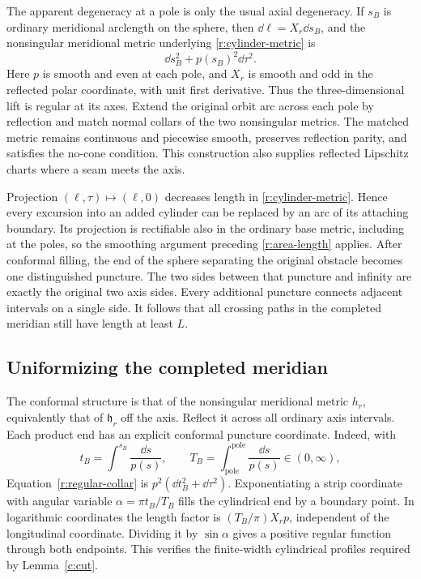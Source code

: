 The apparent degeneracy at a pole is only the usual axial degeneracy.
If $s_B$ is ordinary meridional arclength on the sphere, then
$\dd\ell=X_r\dd s_B$, and the nonsingular meridional metric underlying
\eqref{r:cylinder-metric} is
\begin{equation}\label{r:regular-collar}
 \dd s_B^2+p(s_B)^2\dd\tau^2.
\end{equation}
Here $p$ is smooth and even at each pole, and $X_r$ is smooth and odd in
the reflected polar coordinate, with unit first derivative.  Thus the
three-dimensional lift is regular at its axes.  Extend the original
orbit arc across each pole by reflection and match normal collars of the
two nonsingular metrics.  The matched metric remains continuous and
piecewise smooth, preserves reflection parity, and satisfies the no-cone
condition.  This construction also supplies reflected Lipschitz charts
where a seam meets the axis.

Projection $(\ell,\tau)\mapsto(\ell,0)$ decreases length in
\eqref{r:cylinder-metric}.  Hence every excursion into an added cylinder
can be replaced by an arc of its attaching boundary.  Its projection is
rectifiable also in the ordinary base metric, including at the poles,
so the smoothing argument preceding \eqref{r:area-length} applies.
After conformal filling, the end of the sphere separating the original
obstacle becomes one distinguished puncture.  The two sides between that
puncture and infinity are exactly the original two axis sides.  Every
additional puncture connects adjacent intervals on a single side.
It follows that all crossing paths in the completed meridian still
have length at least $L$.

\subsection{Uniformizing the completed meridian}
\label{r:uniformization}

The conformal structure is that of the nonsingular meridional metric
$h_r$, equivalently that of $\mathfrak h_r$ off the axis.  Reflect it
across all ordinary axis intervals.  Each product end has an explicit
conformal puncture coordinate.  Indeed, with
\[
 t_B=\int^{s_B}\frac{\dd s}{p(s)},
 \qquad T_B=\int_{\text{pole}}^{\text{pole}}\frac{\dd s}{p(s)}\in(0,\infty),
\]
Equation~\eqref{r:regular-collar} is
$p^2(\dd t_B^2+\dd\tau^2)$.  Exponentiating a strip coordinate with
angular variable $\alpha=\pi t_B/T_B$ fills the cylindrical end by a
boundary point.  In logarithmic coordinates the length factor is
$(T_B/\pi)X_rp$, independent of the longitudinal coordinate.  Dividing
it by $\sin\alpha$ gives a positive regular function through both
endpoints.  This verifies the finite-width cylindrical profiles required
by Lemma~\ref{c:cut}.

